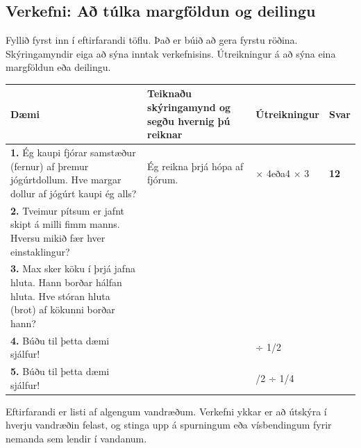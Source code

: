 \documentclass[
  icelandic,
]{book}
\begin{document}
\subsection{Verkefni: Að túlka margföldun og deilingu}\label{verkefni-auxf0-tuxfalka-margfuxf6ldun-og-deilingu}

Fyllið fyrst inn í eftirfarandi töflu. Það er búið að gera fyrstu röðina. Skýringamyndir eiga að sýna inntak verkefnisins. Útreikningur á að sýna eina margföldun eða deilingu.

\begin{longtable}[]{@{}
  >{\raggedright\arraybackslash}p{}
  >{\raggedright\arraybackslash}p{}
  >{\raggedright\arraybackslash}p{}
  >{\raggedright\arraybackslash}p{}@{}}
\toprule\noalign{}
\begin{minipage}[b]{\linewidth}\raggedright
\textbf{Dæmi}
\end{minipage} & \begin{minipage}[b]{\linewidth}\raggedright
\textbf{Teiknaðu skýringamynd og segðu hvernig þú reiknar}
\end{minipage} & \begin{minipage}[b]{\linewidth}\raggedright
\textbf{Útreikningur}
\end{minipage} & \begin{minipage}[b]{\linewidth}\raggedright
\textbf{Svar}
\end{minipage} \\
\midrule\noalign{}
\endhead
\bottomrule\noalign{}
\endlastfoot
\textbf{1.} Ég kaupi fjórar samstæður (fernur) af þremur jógúrtdollum. Hve margar dollur af jógúrt kaupi ég alls? & Ég reikna þrjá hópa af fjórum. & 3 × 4eða4 × 3 & \textbf{12} \\
\textbf{2.} Tveimur pítsum er jafnt skipt á milli fimm manns. Hversu mikið fær hver einstaklingur? & & & \\
\textbf{3.} Max sker köku í þrjá jafna hluta. Hann borðar hálfan hluta. Hve stóran hluta (brot) af kökunni borðar hann? & & & \\
\textbf{4.} Búðu til þetta dæmi sjálfur! & & 3 ÷ 1/2 & \\
\textbf{5.} Búðu til þetta dæmi sjálfur! & & 1/2 ÷ 1/4 & \\
\end{longtable}

Eftirfarandi er listi af algengum vandræðum. Verkefni ykkar er að útskýra í hverju vandræðin felast, og stinga upp á spurningum eða vísbendingum fyrir nemanda sem lendir í vandanum.
\end{document}
